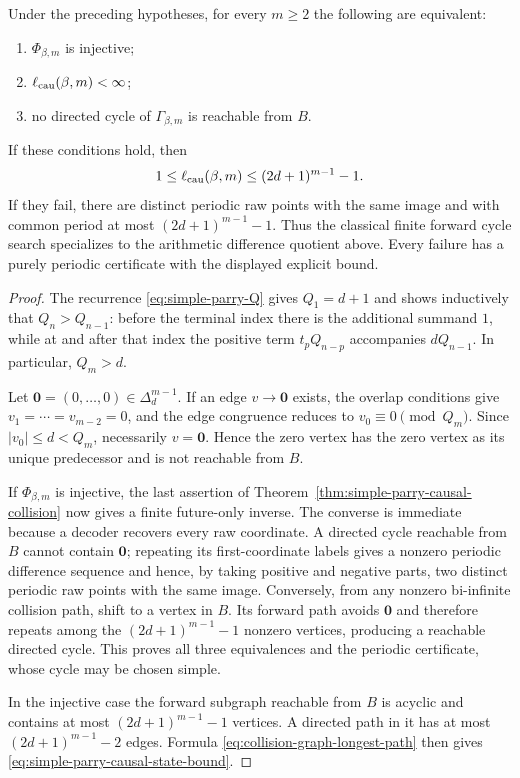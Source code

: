 \begin{corollary}
\label{cor:simple-parry-causal-completeness}
Under the preceding hypotheses, for every $m\ge2$ the following are
equivalent:
\begin{enumerate}[label=\textup{(\roman*)}]
  \item $\Phi_{\beta,m}$ is injective;
  \item $\ell_{\rm cau}(\beta,m)<\infty$;
  \item no directed cycle of $\Gamma_{\beta,m}$ is reachable from $B$.
\end{enumerate}
If these conditions hold, then
\begin{equation}
1\le \ell_{\rm cau}(\beta,m)
\le (2d+1)^{m-1}-1.
\label{eq:simple-parry-causal-state-bound}
\end{equation}
If they fail, there are distinct periodic raw points with the same image and
with common period at most $(2d+1)^{m-1}-1$.  Thus the classical finite
forward cycle search specializes to the arithmetic difference quotient
above.  Every failure has a purely periodic certificate with the displayed
explicit bound.
\end{corollary}

\begin{proof}
The recurrence \eqref{eq:simple-parry-Q} gives $Q_1=d+1$ and shows
inductively that $Q_n>Q_{n-1}$: before the terminal index there is the
additional summand $1$, while at and after that index the positive term
$t_pQ_{n-p}$ accompanies $dQ_{n-1}$.  In particular, $Q_m>d$.

Let $\mathbf0=(0,\ldots,0)\in\Delta_d^{m-1}$.  If an edge
$v\to\mathbf0$ exists, the overlap conditions give
$v_1=\cdots=v_{m-2}=0$, and the edge congruence reduces to
$v_0\equiv0\pmod{Q_m}$.  Since $|v_0|\le d<Q_m$, necessarily
$v=\mathbf0$.  Hence the zero vertex has the zero vertex as its unique
predecessor and is not reachable from $B$.

If $\Phi_{\beta,m}$ is injective, the last assertion of
Theorem~\ref{thm:simple-parry-causal-collision} now gives a finite
future-only inverse.  The converse is immediate because a decoder recovers every raw
coordinate.  A directed cycle reachable from $B$ cannot contain
$\mathbf0$; repeating its first-coordinate labels gives a nonzero periodic
difference sequence and hence, by taking positive and negative parts, two
distinct periodic raw points with the same image.  Conversely, from any
nonzero bi-infinite collision path, shift to a vertex in $B$.  Its forward
path avoids $\mathbf0$ and therefore repeats among the
$(2d+1)^{m-1}-1$ nonzero vertices, producing a reachable directed cycle.
This proves all three equivalences and the periodic certificate, whose cycle
may be chosen simple.

In the injective case the forward subgraph reachable from $B$ is acyclic and
contains at most $(2d+1)^{m-1}-1$ vertices.  A directed path in it has at
most $(2d+1)^{m-1}-2$ edges.  Formula
\eqref{eq:collision-graph-longest-path} then gives
\eqref{eq:simple-parry-causal-state-bound}.
\end{proof}


